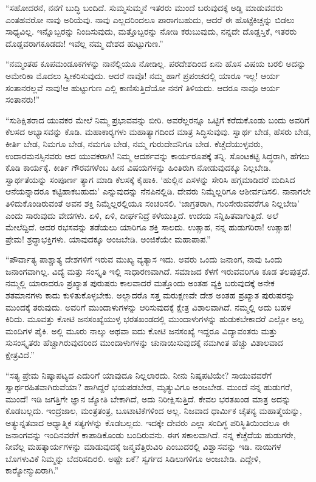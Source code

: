  “ಸಹೋದರನೆ, ನನಗೆ ಬುದ್ಧಿ ಬಂದಿದೆ. ಸುಮ್ಮಸುಮ್ಮನೆ ಇತರರು ಮುಂದೆ ಬರುವುದಕ್ಕೆ ಅಡ್ಡಿ ಮಾಡುವವರು ಎಂತಹವರೋ ನಾವು ಅರಿಯೆವು. ನಾವು ಎಲ್ಲದರಿಂದಲೂ ಪಾರಾಗಬಹುದು, ಆದರೆ ಈ ಹೊಟ್ಟೆಕಿಚ್ಚನ್ನು ಬಿಡಲು ಸಾಧ್ಯವಿಲ್ಲ. ಇನ್ನೊಬ್ಬರನ್ನು ನಿಂದಿಸುವುದು, ಮತ್ತೊಬ್ಬರನ್ನು ನೋಡಿ ಕರುಬುವುದು, ನನ್ನದೇ ದೊಡ್ಡಸ್ತಿಕೆ, ಇತರರು ದೊಡ್ಡವರಾಗಕೂಡದು! ಇವೆಲ್ಲ ನಮ್ಮ ದೇಶದ ಹುಟ್ಟುಗುಣ.” 

 “ನಮ್ಮಂತಹ ಕೂಪಮಂಡೂಕಗಳನ್ನು ನಾನೆಲ್ಲಿಯೂ ನೋಡಿಲ್ಲ. ಪರದೇಶದಿಂದ ಏನು ಹೊಸ ವಿಷಯ ಬರಲಿ ಅದನ್ನು ಅಮೇರಿಕಾ ಮೊದಲು ಸ್ವೀಕರಿಸುವುದು. ಆದರೆ ನಾವೊ! ನಮ್ಮ ಹಾಗೆ ಪ್ರಪಂಚದಲ್ಲಿ ಯಾರೂ ಇಲ್ಲ! ಆರ್ಯ ಸಂತಾನರಲ್ಲವೆ ನಾವು!‌ಆ ಹುಟ್ಟುಗುಣ ಎಲ್ಲಿ ಕಾಣಿಸುತ್ತಿದೆಯೋ ನನಗೆ ತಿಳಿಯದು. ಆದರೂ ನಾವೂ ಆರ್ಯ ಸಂತಾನರು!” 

 “ಸುಶಿಕ್ಷಿತರಾದ ಯುವಕರ ಮೇಲೆ ನಿಮ್ಮ ಪ್ರಭಾವವನ್ನು ಬೀರಿ. ಅವರೆಲ್ಲರನ್ನೂ ಒಟ್ಟಿಗೆ ಕರೆದುಕೊಂಡು ಬಂದು ಅವರಿಗೆ ಕೆಲಸದ ಅಭ್ಯಾಸವನ್ನು ಕೊಡಿ. ಮಹಾಕಾರ‍್ಯಗಳು ಮಹಾತ್ಯಾಗದಿಂದ ಮಾತ್ರ ಸಿದ್ಧಿಸುವುವು. ಸ್ವಾರ್ಥ ಬೇಡ, ಹೆಸರು ಬೇಡ, ಕೀರ್ತಿ ಬೇಡ, ನಿಮಗೂ ಬೇಡ, ನಮಗೂ ಬೇಡ, ನಮ್ಮ ಗುರುದೇವನಿಗೂ ಬೇಡ. ಕೆಚ್ಚೆದೆಯುಳ್ಳವರು, ಉದಾರಮನಸ್ಸಿನವರು ಆದ ಯುವಕರಾಗಿ! ನಿಮ್ಮ ಆದರ್ಶವನ್ನು ಕಾರ್ಯರೂಪಕ್ಕೆ ತನ್ನಿ. ಸೊಂಟಕಟ್ಟಿ ಸಿದ್ಧರಾಗಿ, ಹೆಗಲು ಕೊಡಿ ಕಾರ್ಯಕ್ಕೆ. ಕೀರ್ತಿ ಗೌರವಗಳೆಂಬ ಹೀನ ವಿಷಯಗಳನ್ನು ಹಿಂತಿರುಗಿ ನೋಡುವುದಕ್ಕೂ ನಿಲ್ಲಬೇಡಿ. ಸ್ವಾರ್ಥತೆಯನ್ನು ಸಂಪೂರ್ಣ ತ್ಯಾಗ ಮಾಡಿ ಕೆಲಸಕ್ಕೆ ಕೈಹಾಕಿ. ‘ಹುಲ್ಲಿನ ಎಸಳನ್ನು ಸೇರಿಸಿ ಹಗ್ಗಮಾಡಿದರೆ ಮದಿಸಿದ ಆನೆಯನ್ನಾದರೂ ಕಟ್ಟಿಹಾಕಬಹುದು’ ಎನ್ನುವುದನ್ನು ನೆನಪಿನಲ್ಲಿಡಿ. ದೇವರು ನಿಮ್ಮೆಲ್ಲರಿಗೂ ಆಶೀರ್ವದಿಸಲಿ. ನಾನಾಗಲೇ ತಿಳಿದುಕೊಂಡಿರುವಂತೆ ಅವನ ಶಕ್ತಿ ನಿಮ್ಮೆಲ್ಲರಲ್ಲಿಯೂ ಸಂಚರಿಸಲಿ. ‘ಜಾಗ್ರತರಾಗಿ, ಗುರಿಸೇರುವವರೆಗೂ ನಿಲ್ಲಬೇಡಿ’ ಎಂದು ಸಾರುವುದು ವೇದಗಳು. ಏಳಿ, ಏಳಿ, ದೀರ್ಘನಿದ್ರೆ ಕಳೆಯುತ್ತಿದೆ. ಉದಯ ಸನ್ನಿಹಿತವಾಗುತ್ತಿದೆ. ಅಲೆ ಮೇಲೆದ್ದಿದೆ. ಅದರ ರಭಸವನ್ನು ತಡೆಯಲು ಯಾರಿಗೂ ಶಕ್ತಿ ಸಾಲದು. ಉತ್ಸಾಹ, ನನ್ನ ಹುಡುಗರಿರಾ! ಉತ್ಸಾಹ! ಪ್ರೇಮ! ಶ್ರದ್ಧಾಭಕ್ತಿಗಳು. ಯಾವುದಕ್ಕೂ ಅಂಜಬೇಡಿ. ಅಂಜಿಕೆಯೇ ಮಹಾಪಾಪ.” 

 “ಪೌರ್ವಾತ್ಯ ಪಾಶ್ಚಾತ್ಯ ದೇಶಗಳಿಗೆ ಇರುವ ಮುಖ್ಯ ವ್ಯತ್ಯಾಸ ಇದು. ಅವರು ಒಂದು ಜನಾಂಗ, ನಾವು ಒಂದು ಜನಾಂಗವಾಗಿಲ್ಲ. ವಿದ್ಯೆ ಮತ್ತು ಸಂಸ್ಕೃತಿ ಇಲ್ಲಿ ಸಾಧಾರಣವಾಗಿದೆ. ಸಮಾಜದ ಕೆಳಗೆ ಇರುವವರಿಗೂ ಕೂಡ ತಲಪುತ್ತದೆ. ನಮ್ಮಲ್ಲಿ ಯಾರಾದರೂ ಪ್ರಖ್ಯಾತ ಪುರುಷರು ಕಾಲವಾದರೆ ಮತ್ತೊಂದು ಅಂತಹ ವ್ಯಕ್ತಿ ಬರುವುದಕ್ಕೆ ಅನೇಕ ಶತಮಾನಗಳು ಕಾದು ಕುಳಿತುಕೊಳ್ಳಬೇಕು. ಅಲ್ಲಾದರೊ ಸತ್ತ ಮರುಕ್ಷಣವೇ ದೇಶ ಅಂತಹ ಪ್ರಖ್ಯಾತ ಪುರುಷರನ್ನು ಮುಂದಕ್ಕೆ ತರುವುದು. ಅವರಿಗೆ ಮುಂದಾಳುಗಳನ್ನು ಆರಿಸುವುದಕ್ಕೆ ಕ್ಷೇತ್ರ ವಿಶಾಲವಾಗಿದೆ. ನಮ್ಮಲ್ಲಿ ಅದು ಬಹಳ ಕಿರಿದು. ಮೂವತ್ತು ಕೋಟಿ ಜನಸಂಖ್ಯೆಯುಳ್ಳ ಭರತಖಂಡದಲ್ಲಿ ಮುಂದಾಳುಗಳನ್ನು ಹುಡುಕಬೇಕಾದರೆ ಎಲ್ಲೋ ಅಲ್ಪ ಮಂದಿಗಳ ಪೈಕಿ. ಅಲ್ಲಿ ಮೂರು ನಾಲ್ಕು ಅಥವಾ ಐದು ಕೋಟಿ ಜನಸಂಖ್ಯೆ ಇದ್ದರೂ ವಿದ್ಯಾವಂತರು ಮತ್ತು ಸುಸಂಸ್ಕೃತರು ಹೆಚ್ಚಾಗಿರುವುದರಿಂದ ಮುಂದಾಳುಗಳನ್ನು ಚುನಾಯಿಸುವುದಕ್ಕೆ ನಮಗಿಂತ ಹೆಚ್ಚು ವಿಶಾಲವಾದ ಕ್ಷೇತ್ರವಿದೆ.” 

 “ಸತ್ಯ ಪ್ರೇಮ ನಿಷ್ಕಾಪಟ್ಯದ ಎದುರಿಗೆ ಯಾವುದೂ ನಿಲ್ಲಲಾರದು. ನೀನು ನಿಷ್ಕಪಟಿಯೇ? ಸಾಯುವವರೆಗೆ ಸ್ವಾರ್ಥರಹಿತವಾಗಿರುವೆಯಾ? ಹಾಗಿದ್ದರೆ ಭಯಪಡಬೇಡ, ಮೃತ್ಯುವಿಗೂ ಅಂಜಬೇಡ. ಮುಂದೆ ನನ್ನ ಹುಡುಗರೆ, ಮುಂದೆ! ಇಡಿ ಜಗತ್ತಿಗೇ ಜ್ಞಾನ ಜ್ಯೋತಿ ಬೇಕಾಗಿದೆ, ಅದು ನಿರೀಕ್ಷಿಸುತ್ತಿದೆ. ಕೇವಲ ಭರತಖಂಡ ಮಾತ್ರ ಅದನ್ನು ಕೊಡಬಲ್ಲದು. ಇಂದ್ರಜಾಲ, ಮಂತ್ರತಂತ್ರ, ಬೂಟಾಟಿಕೆಗಳಿಂದ ಅಲ್ಲ. ನಿಜವಾದ ಧಾರ್ಮಿಕ ಚೈತನ್ಯ ಮಹಾತ್ಮೆಯನ್ನು, ಅತ್ಯುನ್ನತವಾದ ಆಧ್ಯಾತ್ಮಿಕ ಸತ್ಯಗಳನ್ನು ಕೊಡಬಲ್ಲದು. ಇದಕ್ಕೇ ದೇವರು ಎಲ್ಲಾ ಸಂದಿಗ್ಧ ಪರಿಸ್ಥಿತಿಯಿಂದಲೂ ಈ ಜನಾಂಗವನ್ನು ಇಂದಿನವರೆಗೆ ಕಾಪಾಡಿಕೊಂಡು ಬಂದಿರುವನು. ಈಗ ಸಕಾಲವಾಗಿದೆ. ನನ್ನ ಕೆಚ್ಚೆದೆಯ ಹುಡುಗರೇ, ನೀವೆಲ್ಲ ಮಹತ್ಕಾರ್ಯಗಳನ್ನು ಮಾಡುವುದಕ್ಕೆ ಜನ್ಮವೆತ್ತಿರುವಿರಿ ಎಂಬುದರಲ್ಲಿ ವಿಶ್ವಾಸವನ್ನು ಇಡಿ. ನಾಯಿಗಳ ಬೊಗಳುವಿಕೆ ನಿಮ್ಮನ್ನು ಬೆದರಿಸದಿರಲಿ. ಅಷ್ಟೇ ಏಕೆ? ಸ್ವರ್ಗದ ಸಿಡಿಲುಗಳಿಗೂ ಅಂಜಬೇಡಿ. ಎದ್ದೇಳಿ, ಕಾರ‍್ಯೋನ್ಮುಖರಾಗಿ.” 

